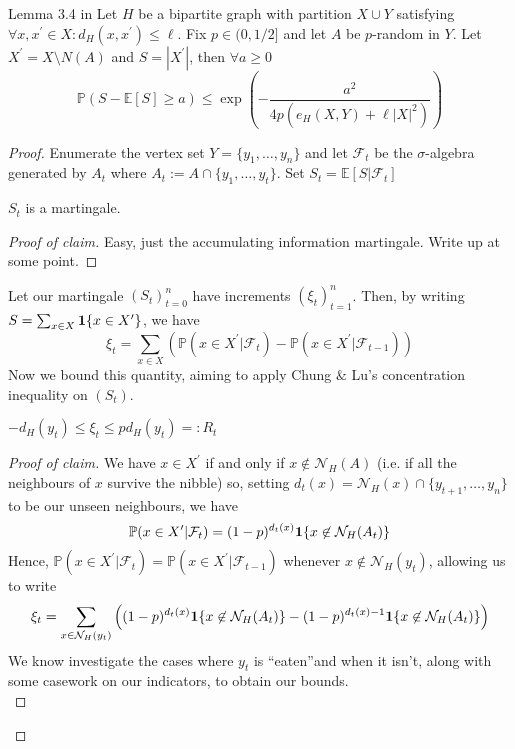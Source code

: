 \documentclass{article}
\begin{document}
\begin{lemma}[]{Lemma 3.4 in \cite{campos2023}}
    Let $H$ be a bipartite graph with partition $X \cup Y$ satisfying $\forall x, x^\prime \in X : 
    d_{H}(x, x^\prime) \leq \ell$. Fix $p \in (0, 1/2]$ and let $A$ be $p$-random in $Y$. Let $X^\prime = 
    X \setminus N(A)$ and $S = |X^\prime|$, then $\forall a \geq 0$ 
    \[\mathbb{P}(S - \mathbb{E}[S] \geq a) \leq \exp\left(-\frac{a^2}{4p(e_H(X,Y) +\ell |X|^2)}\right)\]
\end{lemma}

\begin{proof}
    Enumerate the vertex set $Y = \{y_1, \dots, y_n\}$ and let $\mathcal{F}_t$ be the $\sigma$-algebra generated 
    by $A_t$ where $A_t := A \cap \{y_1, \dots, y_t\}$. Set $S_t = \mathbb{E}[S | \mathcal{F}_t]$
    \begin{claim}
        $S_t$ is a martingale. 
    \end{claim}
    \begin{proof}[Proof of claim]
        Easy, just the accumulating information martingale. Write up at some point. 
    \end{proof}
    Let our martingale $(S_t)_{t=0}^n$ have increments $(\xi_t)_{t=1}^n$. Then, by writing $S = \sum_{x \in X}
    {\bf 1}\{x \in X^\prime\}$, we have 
    \[\xi_t = \sum_{x \in X}(\mathbb{P}(x \in X^\prime | \mathcal{F}_t) - \mathbb{P}(x \in X^\prime | \mathcal{F}_{t-1}))\]
    Now we bound this quantity, aiming to apply Chung $\&$ Lu's concentration inequality on $(S_t)$. 
    \begin{claim}
        $-d_H(y_t) \leq \xi_t \leq pd_H(y_t) =: R_t$ 
    \end{claim}
    \begin{proof}[Proof of claim]
        We have $x \in X^\prime$ if and only if $x \not\in \mathcal{N}_H(A)$ (i.e. if all the neighbours of 
        $x$ survive the nibble) so, setting $d_t(x) = \mathcal{N}_H(x) \cap \{y_{t+1}, \dots, y_n\}$ to be our unseen 
        neighbours, we have 
        \[\mathbb{P}(x \in X^\prime | \mathcal{F}_t) = (1 - p)^{d_t(x)}{\bf 1}\{x \not\in \mathcal{N}_H(A_t)\}\]
        Hence, $\mathbb{P}(x \in X^\prime | \mathcal{F}_t) = \mathbb{P}(x \in X^\prime | \mathcal{F}_{t-1})$ whenever 
        $x \not\in \mathcal{N}_H(y_t)$, allowing us to write 
        \[\xi_t = \sum_{x \in \mathcal{N}_H(y_t)}\left((1-p)^{d_t(x)}{\bf 1}\{x \not\in \mathcal{N}_H(A_t)\}
        - (1-p)^{d_t(x) - 1}{\bf 1}\{x \not\in \mathcal{N}_H(A_t)\}\right)\]
        We know investigate the cases where $y_t$ is ``eaten''and when it isn't, along with some casework on our indicators, 
        to obtain our bounds. \\ 
        

\end{proof}
\end{proof}
\end{document}
